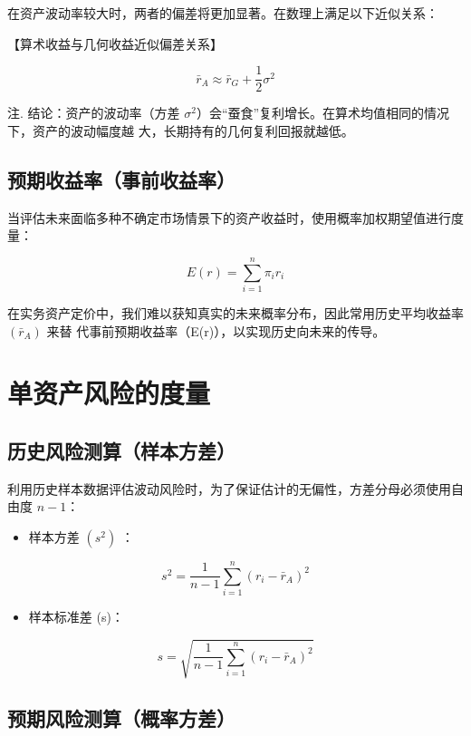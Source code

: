 \documentclass[lang=cn,10pt,color=blue]{elegantbook}
\begin{document}
在资产波动率较大时，两者的偏差将更加显著。在数理上满足以下近似关系： 

【算术收益与几何收益近似偏差关系】 

$$
\boxed {\bar {r} _ {A} \approx \bar {r} _ {G} + \frac {1}{2} \sigma^ {2}}
$$

注. 结论：资产的波动率（方差 $\sigma^2$）会“蚕食”复利增长。在算术均值相同的情况下，资产的波动幅度越 大，长期持有的几何复利回报就越低。 

\subsection{预期收益率（事前收益率）}

当评估未来面临多种不确定市场情景下的资产收益时，使用概率加权期望值进行度量： 

$$
E (r) = \sum_ {i = 1} ^ {n} \pi_ {i} r _ {i}
$$

在实务资产定价中，我们难以获知真实的未来概率分布，因此常用历史平均收益率 $( { \bar { r } } _ { A } )$ 来替 代事前预期收益率（E(r)），以实现历史向未来的传导。 

\section{单资产风险的度量}

\subsection{历史风险测算（样本方差）}

利用历史样本数据评估波动风险时，为了保证估计的无偏性，方差分母必须使用自由度 $n - 1$： 

\begin{itemize}
  \item 样本方差 $( s ^ { 2 } )$ ：
\end{itemize}

$$
s ^ {2} = \frac {1}{n - 1} \sum_ {i = 1} ^ {n} (r _ {i} - \bar {r} _ {A}) ^ {2}
$$

\begin{itemize}
  \item 样本标准差 (s)：
\end{itemize}

$$
s = \sqrt {\frac {1}{n - 1} \sum_ {i = 1} ^ {n} (r _ {i} - \bar {r} _ {A}) ^ {2}}
$$

\subsection{预期风险测算（概率方差）}
\end{document}
